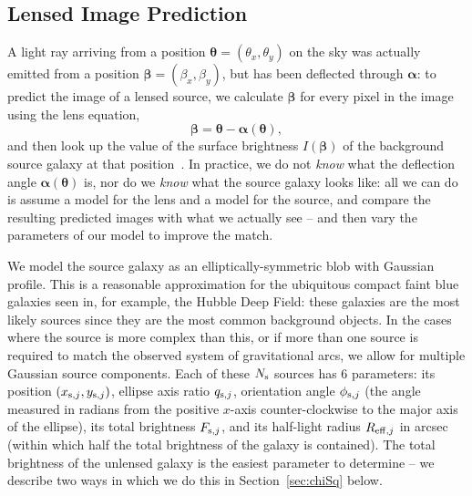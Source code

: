 \documentclass[iop]{emulateapj}
\def\eg{{\it e.g.}\,}
\def\xsj{x_{{\rm s},j}}
\def\ysj{y_{{\rm s},j}}
\def\phisj{\phi_{{\rm s},j}}
\def\qsj{q_{{\rm s},j}}
\def\reffj{R_{{\rm eff},j}}
\def\Fsj{F_{{\rm s},j}}
\def\Ns{N_{\rm s}}
\begin{document}

\subsection{Lensed Image Prediction}
\label{sec:model:image}

A light ray arriving from a position $\boldsymbol{\theta} = (\theta_x,\theta_y)$
on the sky was actually emitted from a position  $\boldsymbol{\beta} =
(\beta_x,\beta_y)$, but has been deflected through $\boldsymbol{\alpha}$: to
predict the image of a lensed source, we calculate  $\boldsymbol{\beta}$ for
every pixel in the image using the lens equation,
\begin{equation}
  \boldsymbol{\beta} = \boldsymbol{\theta} - 
                         \boldsymbol{\alpha}(\boldsymbol{\theta}),
\end{equation}
and then look up the value of the surface brightness $I(\boldsymbol{\beta})$  of
the background source galaxy at that  position~\citep[\eg][]{New++02,Mar++07}.  
In practice, we do not  {\it know} what the deflection angle 
$\boldsymbol{\alpha}(\boldsymbol{\theta})$ is, nor do we {\it know} what the
source galaxy looks like: all we can do is assume a model for the lens and a
model for the source, and compare the resulting predicted images with what we
actually see -- and then vary the parameters of our model to improve the match.

We model the source galaxy as an elliptically-symmetric blob with Gaussian
profile. This is a reasonable approximation for the ubiquitous compact faint
blue galaxies seen in, for example, the Hubble Deep Field: these galaxies are
the most likely sources since they are the most common background objects. In
the cases where the source is more complex than this, or if more than one source
is required to match the observed system of gravitational arcs, we allow for
multiple Gaussian source components. Each of these $\Ns$ sources has 6
parameters: its position $(\xsj,\ysj)$, ellipse axis ratio $\qsj$, orientation
angle $\phisj$ (the angle measured in radians from the positive $x$-axis
counter-clockwise to the major axis of the ellipse),  its total brightness
$\Fsj$, and its half-light radius $\reffj$ in arcsec (within which half the
total brightness of the galaxy is contained). The total brightness of the
unlensed galaxy is the easiest parameter to determine -- we describe two ways in
which we do this in Section~\ref{sec:chiSq} below.
\end{document}
